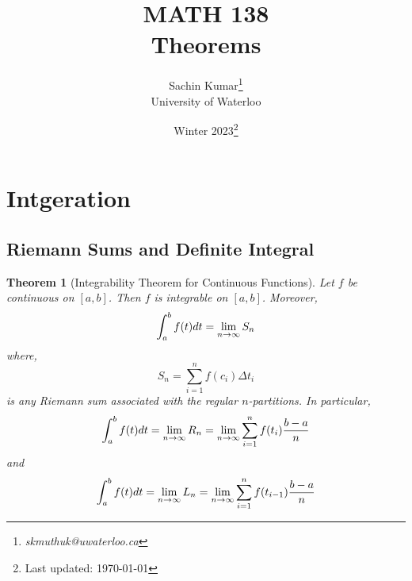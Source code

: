 \documentclass[10pt]{article}
\theoremstyle{break}
\newtheorem{thm}{Theorem}[subsection]
\newcommand{\subject}{MATH 138 \\ Theorems}
\newcommand{\semester}{Winter 2023}
\begin{document}
\let\ref\Cref

\title{\subject}
\author{Sachin Kumar\thanks{\itshape skmuthuk@uwaterloo.ca}\\ University of Waterloo}
\date{\semester\thanks{Last updated: \today}}

\maketitle
\newpage
\tableofcontents
\newpage



\section{Intgeration}
\subsection{Riemann Sums and Definite Integral}
\begin{thm}[Integrability Theorem for Continuous Functions]
Let $f$ be continuous on $[a, b]$. Then $f$ is integrable on $[a,b]$. Moreover, 
$$\int^b_a f(t) \space dt = \lim_{n \to \infty}S_n$$ where, $$S_n = \sum^n_{i = 1}f(c_i) \Delta t_i$$ is any Riemann sum associated with the regular $n$-partitions. In particular, $$\int^b_a f(t) \space dt=\lim_{n \to \infty} R_n = \lim_{n \to \infty} \sum^n_{i = 1} f(t_i)\dfrac{b-a}{n}$$ and $$\int^b_a f(t) \space dt=\lim_{n \to \infty} L_n = \lim_{n \to \infty} \sum^n_{i = 1} f(t_{i - 1}) \dfrac{b-a}{n}$$
\end{thm}
\end{document}
